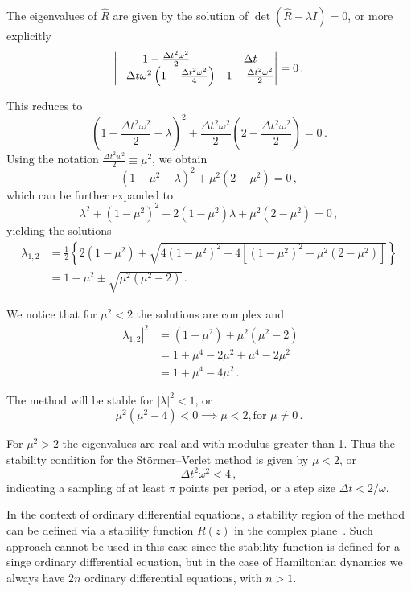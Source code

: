 \documentclass[class=report, crop=false]{standalone}
\begin{document}
The eigenvalues of \(\hat{R}\) are given by the solution of
\(
\det(\hat{R} - \lambda I) = 0
\), or more explicitly
\[
\vmqty{
1 - \frac{\Delta t^2 \omega^2}{2} & \Delta t \\
-\Delta t \omega^2 \left(1 - \frac{\Delta t^2 \omega^2}{4}\right) &
1 - \frac{\Delta t^2 \omega^2}{2}
} = 0\,.
\]

This reduces to
\[
\left(1-\frac{\Delta t^{2} \omega^2}{2}-\lambda\right)^{2}+
\frac{\Delta t^{2} \omega^2}{2}\left(2-\frac{\Delta t^2 \omega^2}{2}\right) = 0\,.
\]
Using the notation \(\frac{\Delta t^{2} w^{2}}{2}\equiv\mu^{2}\),
we obtain
\[
\left(1-\mu^{2}-\lambda\right)^2+\mu^{2}\left(2-\mu^{2}\right)=0\,,
\]
which can be further expanded to
\[
\lambda^{2}+\left(1-\mu^{2}\right)^{2}-2\left(1-\mu^{2}\right) \lambda+\mu^{2}\left(2-\mu^{2}\right)=0\,,
\]
yielding the solutions
\begin{align*}
  \lambda_{1,2} &= \frac{1}{2} \left\{2(1-\mu^2) \pm
  \sqrt{4(1-\mu^2)^2 - 4\left[(1-\mu^2)^2 + \mu^2 (2-\mu^2)\right]}\right\} \\
  &= 1-\mu^2 \pm \sqrt{\mu^2(\mu^2-2)}\,.
\end{align*}

We notice that for \(\mu^2 < 2\) the solutions are complex and
\begin{align*}
  |\lambda_{1,2}|^2 &= (1-\mu^2) + \mu^2 (\mu^2-2) \\
  &= 1+\mu^4-2\mu^2+\mu^4-2\mu^2 \\
  &= 1+\mu^4-4\mu^2\,.
\end{align*}

The method will be stable for \(|\lambda|^2 < 1\), or
\[
\mu^2 (\mu^2 - 4) < 0 \implies \mu < 2, \text{for } \mu \ne 0\,.
\]

For \(\mu^2 > 2\) the eigenvalues are real and with modulus greater than 1.
Thus the stability condition for the Störmer–Verlet method is given by \(\mu < 2\),
or
\[
\Delta t^2 \omega^2 < 4\,,
\]
indicating a sampling of at least \(\pi\) points per period, or a step size
\(\Delta t < 2/\omega\).

In the context of ordinary differential equations, a stability region of the method
can be defined via a stability function \(R(z)\) in the complex
plane~\autocite[81]{butcher_numericalmethods_2016}. Such approach cannot be used
in this case since the stability function is defined for a singe ordinary
differential equation, but in the case of Hamiltonian dynamics we always have
\(2n\) ordinary differential equations, with \(n>1\).
\end{document}

